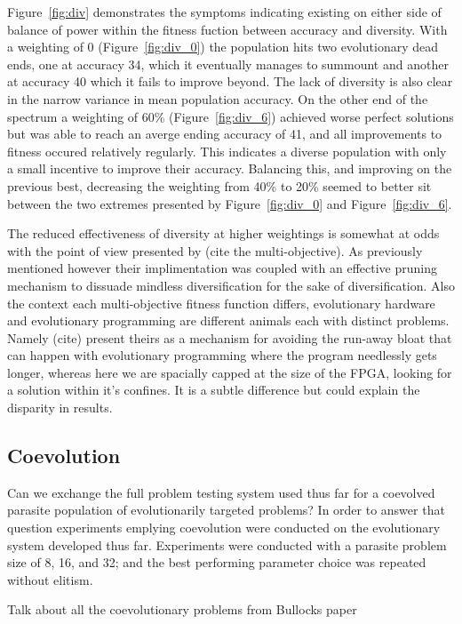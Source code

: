 Figure~\ref{fig:div} demonstrates the symptoms indicating existing on either side of
balance of power within the fitness fuction between accuracy and diversity. With a
weighting of 0 (Figure~\ref{fig:div_0}) the population hits two evolutionary dead ends,
one at accuracy 34, which it eventually manages to summount and another at accuracy 40
which it fails to improve beyond. The lack of diversity is also clear in the narrow
variance in mean population accuracy. On the other end of the spectrum a weighting of
60\% (Figure~\ref{fig:div_6}) achieved worse perfect solutions but was able to reach
an averge ending accuracy of 41, and all improvements to fitness occured relatively
regularly. This indicates a diverse population with only a small incentive to improve
their accuracy. Balancing this, and improving on the previous best, decreasing the
weighting from 40\% to 20\% seemed to better sit between the two extremes presented
by Figure~\ref{fig:div_0} and Figure~\ref{fig:div_6}.

The reduced effectiveness of diversity at higher weightings is somewhat at odds with
the point of view presented by (\todo cite the multi-objective). As previously mentioned
however their implimentation was coupled with an effective pruning mechanism to dissuade
mindless diversification for the sake of diversification. Also the context each multi-objective
fitness function differs, evolutionary hardware and evolutionary programming are different
animals each with distinct problems. Namely (\todo cite) present theirs as a mechanism
for avoiding the run-away bloat that can happen with evolutionary programming where
the program needlessly gets longer, whereas here we are spacially capped at the size of
the FPGA, looking for a solution within it's confines. It is a subtle difference but
could explain the disparity in results.

\subsection{Coevolution}

Can we exchange the full problem testing system used thus far for a coevolved
parasite population of evolutionarily targeted problems? In order to answer that
question experiments emplying coevolution were conducted on the evolutionary
system developed thus far. Experiments were conducted with a parasite problem
size of 8, 16, and 32; and the best performing parameter choice was repeated
without elitism.

\todo Talk about all the coevolutionary problems from Bullocks paper

